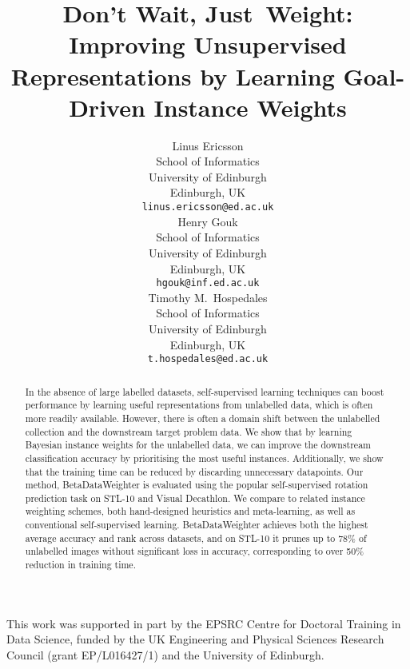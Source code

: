 \documentclass{article}
\title{Don’t Wait, Just~Weight: Improving Unsupervised Representations by Learning Goal-Driven Instance Weights}
\author{Linus Ericsson \\
School of Informatics\\
  University of Edinburgh\\
  Edinburgh, UK \\
  \texttt{linus.ericsson@ed.ac.uk} \\
\And
  Henry Gouk \\
  School of Informatics\\
  University of Edinburgh\\
  Edinburgh, UK \\
  \texttt{hgouk@inf.ed.ac.uk} \\
  \And
  Timothy M.~Hospedales \\
  School of Informatics\\
  University of Edinburgh\\
  Edinburgh, UK \\
  \texttt{t.hospedales@ed.ac.uk} \\
}
\begin{document}
\maketitle

\begin{abstract}
In the absence of large labelled datasets, self-supervised learning techniques can boost performance by learning useful representations from unlabelled data, which is often more readily available. However, there is often a domain shift between the unlabelled collection and the downstream target problem data. We show that by learning Bayesian instance weights for the unlabelled data, we can improve the downstream classification accuracy by prioritising the most useful instances. Additionally, we show that the training time can be reduced by discarding unnecessary datapoints. Our method, BetaDataWeighter is evaluated using the popular self-supervised rotation prediction task on STL-10 and Visual Decathlon. We compare to related instance weighting schemes, both hand-designed heuristics and meta-learning, as well as conventional self-supervised learning. BetaDataWeighter achieves both the highest average accuracy and rank across datasets, and on STL-10 it prunes up to 78\% of unlabelled images without significant loss in accuracy, corresponding to over 50\% reduction in training time.
\end{abstract}









\begin{ack}
This work was supported in part by the EPSRC Centre for Doctoral Training in Data Science, funded by the UK Engineering and Physical Sciences Research Council (grant EP/L016427/1) and the University of Edinburgh.
\end{ack}

\small



\newpage
\appendix

\end{document}
